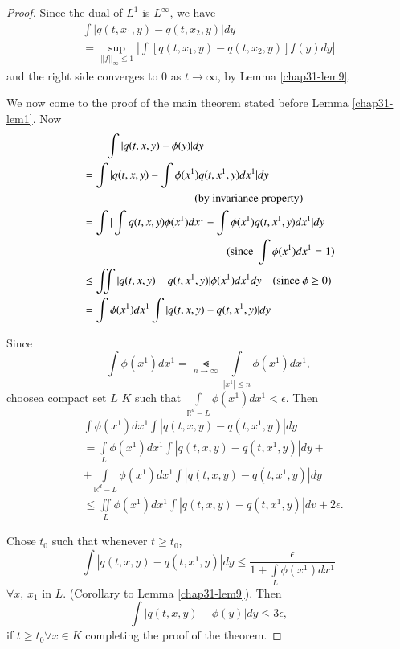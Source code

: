 \begin{proof}
Since the dual of $L^{1}$ is $L^{\infty}$, we have
\begin{gather*}
\int |q(t,x_{1},y)-q(t,x_{2},y)|dy\\
=\sup\limits_{||f||_{\infty}\leq 1}|\int [q(t,x_{1},y)-q(t,x_{2},y)]f(y)dy|
\end{gather*}
and the right side converges to $0$ as $t\to \infty$, by Lemma
\ref{chap31-lem9}.

We now come to the proof of the main theorem stated before Lemma
\ref{chap31-lem1}. Now
\begin{align*}
&\qq \int |q(t,x,y)-\phi(y)|dy\\
&= \int|q(t,x,y)-\int \phi(x^{1})q(t,x^{1},y)dx^{1}|dy\\
&\hspace{3.5cm} \text{(by invariance property)}\\
&= \int |\int q(t,x,y)\phi(x^{1})dx^{1}-\int
  \phi(x^{1})q(t,x^{1},y)dx^{1}|dy\\
&\hspace{4.5cm} (\text{since~ }\int\phi(x^{1})dx^{1}=1)\\
&\leq \iint |q(t,x,y)-q(t,x^{1},y)|\phi(x^{1})dx^{1}dy\q (\text{since~
  } \phi\geq 0)\\
&= \int \phi(x^{1})dx^{1}\int |q(t,x,y)-q(t,x^{1},y)|dy\\
\end{align*}

Since
$$
\int \phi (x^{1})dx^{1}=\Lt\limits_{n\to
  \infty}\int\limits_{|x^{1}|\leq n}\phi(x^{1})dx^{1},
$$
choose\pageoriginale a compact set $L$ $K$ such that
$\int\limits_{\mathbb{R}^{d}-L}\phi(x^{1})dx^{1}<\epsilon$. Then
\begin{align*}
& \int\phi(x^{1})dx^{1}\int |q(t,x,y)-q(t,x^{1},y)|dy\\
& =\int\limits_{L}\phi(x^{1})dx^{1}\int |q(t,x,y)-q(t,x^{1},y)|dy+\\
& +\int\limits_{\mathbb{R}^{d}-L}\phi(x^{1})dx^{1}\int
  |q(t,x,y)-q(t,x^{1},y)|dy\\ 
&\leq \iint\limits_{L}\phi(x^{1})dx^{1}\int
  |q(t,x,y)-q(t,x^{1},y)|dv+2\epsilon. 
\end{align*}

Chose $t_{0}$ such that whenever $t\geq t_{0}$,
$$
\int |q(t,x,y)-q(t,x^{1},y)|dy\leq
\frac{\epsilon}{1+\int\limits_{L}\phi(x^{1})dx^{1}} 
$$
$\forall x$, $x_{1}$ in $L$. (Corollary to Lemma
\ref{chap31-lem9}). Then
$$
\int |q(t,x,y)-\phi(y)|dy\leq 3\epsilon,
$$
if $t\geq t_{0}\forall x\in K$ completing the proof of the theorem.
\end{proof}

